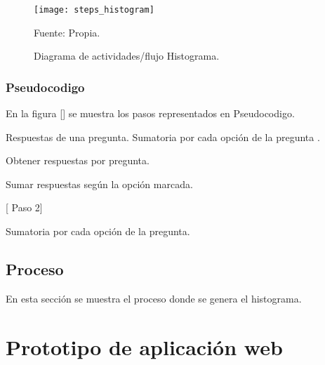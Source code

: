 \begin{figure}[ht]
	\begin{center}
		\texttt{[image: steps\_histogram]}
	\end{center}
	\begin{center}
		\vskip -0.5cm
		\caption{\small{Diagrama de actividades/flujo Histograma. }}
		{\small{Fuente: Propia.}}
	\end{center}
\end{figure}

\subsubsection{Pseudocodigo}
En la figura [] se muestra los pasos representados en Pseudocodigo.

\begin{algorithm}
	\begin{algorithmic}[2]
		\REQUIRE Respuestas de una pregunta.  %
		\label{lin:algorithm_histogram}
		\ENSURE Sumatoria por cada opción de la pregunta .                                                       %
		
		\STATE Obtener respuestas por pregunta.
		
		\STATE Sumar respuestas según la opción marcada. 
		
	
		 [ Paso 2]
		\ENDIF
		
		\RETURN  Sumatoria por cada opción de la pregunta.
		
	\end{algorithmic}
\end{algorithm}

\subsection{Proceso}

En esta sección se muestra el proceso donde se genera el histograma.























\section{Prototipo de aplicación web} 

